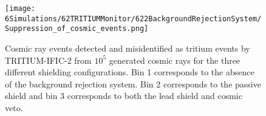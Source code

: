 \begin{figure}[t]
\vspace{-8cm}
\texttt{[image: 6Simulations/62TRITIUMMonitor/622BackgroundRejectionSystem/Suppression\_of\_cosmic\_events.png]}
\centering
\caption{Cosmic ray events detected and misidentified as tritium events by TRITIUM-IFIC-2 from $10^5$ generated cosmic rays for the three different shielding configurations. Bin 1 corresponds to the absence of the background rejection system. Bin 2 corresponds to the passive shield and bin 3 corresponds to both the lead shield and cosmic veto.  \label{fig:CosmicEventsSuppressionSimulated}}
\end{figure}